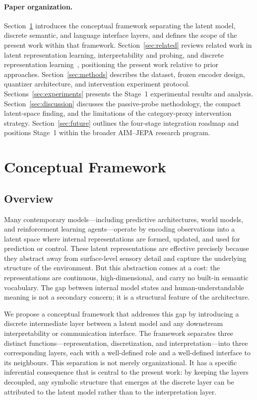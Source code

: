 \documentclass{article}
\begin{document}
\paragraph{Paper organization.}
Section~\ref{sec:framework} introduces the conceptual framework
separating the latent model, discrete semantic, and language interface
layers, and defines the scope of the present work within that
framework.
Section~\ref{sec:related} reviews related work in latent
representation learning, interpretability and probing, and discrete
representation learning~\cite{baek2025discrete,wu2024nlotm}, positioning
the present work relative to prior approaches.
Section~\ref{sec:methods} describes the dataset, frozen encoder
design, quantizer architecture, and intervention experiment protocol.
Sections~\ref{sec:experiments} presents the
Stage~1 experimental results and analysis.
Section~\ref{sec:discussion} discusses the passive-probe methodology,
the compact latent-space finding, and the limitations of the
category-proxy intervention strategy.
Section~\ref{sec:future} outlines the four-stage integration roadmap
and positions Stage~1 within the broader AIM--JEPA research program.


\section{Conceptual Framework}
\label{sec:framework}

\subsection{Overview}

Many contemporary models---including predictive architectures, world
models, and reinforcement learning agents---operate by encoding
observations into a latent space where internal representations are
formed, updated, and used for prediction or control.
These latent representations are effective precisely because they
abstract away from surface-level sensory detail and capture the
underlying structure of the environment.
But this abstraction comes at a cost: the representations are
continuous, high-dimensional, and carry no built-in semantic
vocabulary.
The gap between internal model states and human-understandable
meaning is not a secondary concern; it is a structural feature of the
architecture.

We propose a conceptual framework that addresses this gap by
introducing a discrete intermediate layer between a latent model and
any downstream interpretability or communication interface.
The framework separates three distinct functions---representation,
discretization, and interpretation---into three corresponding layers,
each with a well-defined role and a well-defined interface to its
neighbours.
This separation is not merely organizational.
It has a specific inferential consequence that is central to the
present work: by keeping the layers decoupled, any symbolic structure
that emerges at the discrete layer can be attributed to the latent
model rather than to the interpretation layer.
\end{document}

